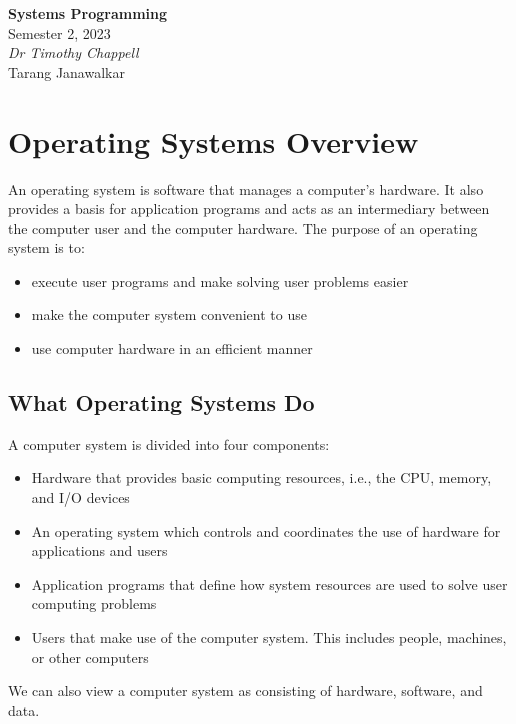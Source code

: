 \documentclass{article}
\date{}
\newcommand{\unitName}{Systems Programming}
\newcommand{\unitTime}{Semester 2, 2023}
\newcommand{\unitCoordinator}{Dr Timothy Chappell}
\newcommand{\documentAuthors}{Tarang Janawalkar}
\begin{document}
%
\begin{titlepage}
    \vspace*{\fill}
    \begin{center}
        \LARGE{\textbf{\unitName}} \\[0.1in]
        \normalsize{\unitTime} \\[0.2in]
        \normalsize\textit{\unitCoordinator} \\[0.2in]
        \documentAuthors
    \end{center}
    \vspace*{\fill}
    \doclicenseThis
    \thispagestyle{empty}
\end{titlepage}
\newpage
%
\tableofcontents
\newpage
%
\section{Operating Systems Overview}
An operating system is software that manages a computer's hardware.
It also provides a basis for application programs and acts as an
intermediary between the computer user and the computer hardware.
The purpose of an operating system is to:
\begin{itemize}
    \item execute user programs and make solving user problems easier
    \item make the computer system convenient to use
    \item use computer hardware in an efficient manner
\end{itemize}
\subsection{What Operating Systems Do}
A computer system is divided into four components:
\begin{itemize}
    \item Hardware that provides basic computing resources, i.e., the CPU, memory, and I/O devices
    \item An operating system which controls and coordinates the use of hardware for applications and users
    \item Application programs that define how system resources are used to solve user computing problems
    \item Users that make use of the computer system. This includes people, machines, or other computers
\end{itemize}
We can also view a computer system as consisting of hardware, software, and data.
\end{document}
